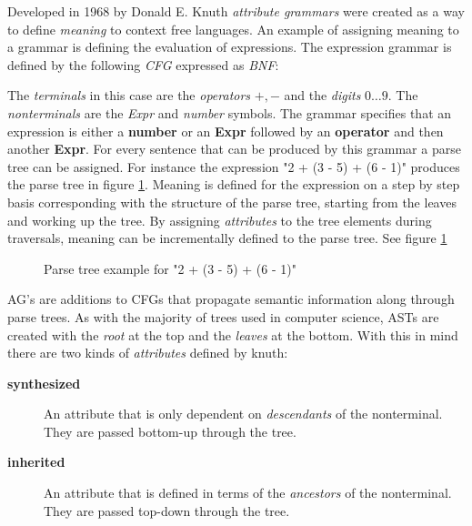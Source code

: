 \documentclass[twoside, titlepage, openright, a4paper]{book}
\newcommand{\ags}{\emph{attribute grammars }}
\begin{document}
Developed in 1968 by Donald E. Knuth \ags were created as a way to define \emph{meaning} to context free languages. An example of assigning meaning to a grammar is defining the evaluation of expressions. The expression grammar is defined by the following \emph{CFG} expressed as \emph{BNF}:



The \emph{terminals} in this case are the \emph{operators} $+,-$ and the \emph{digits} $0\ldots 9$. The \emph{nonterminals} are the \emph{Expr} and \emph{number} symbols. The grammar specifies that an expression is either a \textbf{number} or an \textbf{Expr} followed by an \textbf{operator} and then another \textbf{Expr}. For every sentence that can be produced by this grammar a parse tree can be assigned. For instance the expression "2 + (3 - 5) + (6 - 1)" produces the parse tree in figure \ref{fig.example1.parsetree}. Meaning is defined for the expression on a step by step basis corresponding with the structure of the parse tree, starting from the leaves and working up the tree. By assigning \emph{attributes} to the tree elements during traversals, meaning can be incrementally defined to the parse tree. See figure \ref{fig.example1.parsetree}

\begin{figure}[H]
\centering
{}
\caption{Parse tree example for "2 + (3 - 5) + (6 - 1)"}
\label{fig.example1.parsetree}
\end{figure}

AG's are additions to CFGs that propagate semantic information along through parse trees. As with the majority of trees used in computer science, ASTs are created with the \emph{root} at the top and the \emph{leaves} at the bottom. With this in mind there are two kinds of \emph{attributes} defined by knuth\cite{knuth1}:
\begin{description}
\item[\textbf{synthesized}] An attribute that is only dependent on \emph{descendants} of the nonterminal. They are passed bottom-up through the tree.
\item[\textbf{inherited}] An attribute that is defined in terms of the \emph{ancestors} of the nonterminal. They are passed top-down through the tree.
\end{description}
\end{document}
